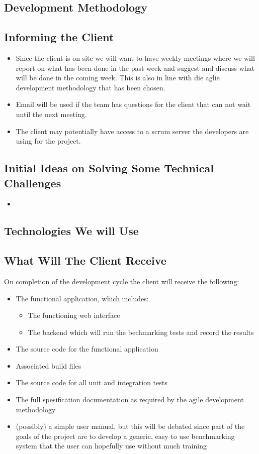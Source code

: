 \subsection{Development Methodology}


\subsection{Informing the Client}
\begin{itemize}
	\item Since the client is on site we will want to have weekly meetings where we will report on what has been done in the past week and suggest and discuss what will be done in the coming week. This is also in line with die aglie development methodology that has been chosen.
	\item Email will be used if the team has questions for the client that can not wait until the next meeting.
	\item The client may potentially have access to a scrum server the developers are using for the project.
\end{itemize}

\subsection{Initial Ideas on Solving Some Technical Challenges}
\begin{itemize}
	\item 
\end{itemize}

\subsection{Technologies We will Use}

\subsection{What Will The Client Receive}
On completion of the development cycle the client will receive the following:
\begin{itemize}
	\item The functional application, which includes:
	\begin{itemize}
		\item The functioning web interface
		\item The backend which will run the bechmarking tests and record the results
	\end{itemize}
	\item The source code for the functional application
	\item Associated build files
	\item The source code for all unit and integration tests
	\item The full spesification documentation as required by the agile development methodology
	\item (possibly) a simple user manual, but this will be debated since part of the goals of the project are to develop a generic, easy to use benchmarking system that the user can hopefully use without much training
\end{itemize}
